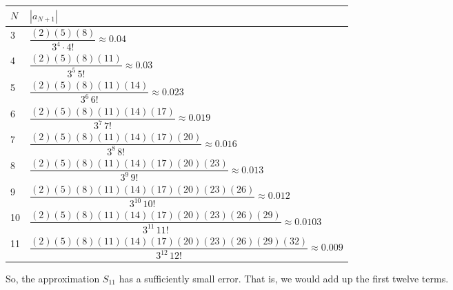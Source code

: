 \begin{solution}
\begin{enumerate}[(a)]
\begin{center}
\begin{tabular}{| m{1cm} | m{10cm} |}
\hline
$N$&$|a_{N+1}|$\\[1em]
\hline
3& $\dfrac{(2)(5)(8)}{3^4\cdot 4!}\approx 0.04$\\[1em]
\hline
4 & $\dfrac{(2)(5)(8)(11)}{3^5\, 5!}\approx 0.03$\\[1em]
\hline
5 & $\dfrac{(2)(5)(8)(11)(14)}{3^6\, 6!}\approx 0.023$\\[1em]
\hline
6 & $\dfrac{(2)(5)(8)(11)(14)(17)}{3^7\, 7!}\approx 0.019$\\[1em]
\hline
7 & $\dfrac{(2)(5)(8)(11)(14)(17)(20)}{3^8\, 8!}\approx 0.016$\\[1em]
\hline
8 & $\dfrac{(2)(5)(8)(11)(14)(17)(20)(23)}{3^9\, 9!}\approx 0.013$\\[1em]
\hline
9 & $\dfrac{(2)(5)(8)(11)(14)(17)(20)(23)(26)}{3^{10}\, 10!}\approx 0.012$\\[1em]
\hline
10 & $\dfrac{(2)(5)(8)(11)(14)(17)(20)(23)(26)(29)}{3^{11}\, 11!}\approx 0.0103$\\[1em]
\hline
11 & $\dfrac{(2)(5)(8)(11)(14)(17)(20)(23)(26)(29)(32)}{3^{12}\, 12!}\approx 0.009$\\[1em]
\hline
\end{tabular}
\end{center}
So, the approximation $S_{11}$ has a sufficiently small error. That is, we would add up the first twelve terms.
	\end{enumerate}
\end{solution}

